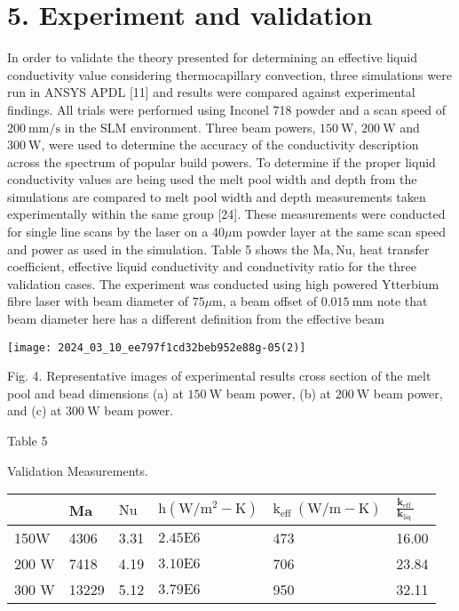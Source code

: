 \documentclass[10pt]{article}
\begin{document}
\section*{5. Experiment and validation}
In order to validate the theory presented for determining an effective liquid conductivity value considering thermocapillary convection, three simulations were run in ANSYS APDL [11] and results were compared against experimental findings. All trials were performed using Inconel 718 powder and a scan speed of $200 \mathrm{~mm} / \mathrm{s}$ in the SLM environment. Three beam powers, $150 \mathrm{~W}$, $200 \mathrm{~W}$ and $300 \mathrm{~W}$, were used to determine the accuracy of the conductivity description across the spectrum of popular build powers. To determine if the proper liquid conductivity values are being used the melt pool width and depth from the simulations are compared to melt pool width and depth measurements taken experimentally within the same group [24]. These measurements were conducted for single line scans by the laser on a $40 \mu \mathrm{m}$ powder layer at the same scan speed and power as used in the simulation. Table 5 shows the $\mathrm{Ma}, \mathrm{Nu}$, heat transfer coefficient, effective liquid conductivity and conductivity ratio for the three validation cases. The experiment was conducted using high powered Ytterbium fibre laser with beam diameter of $75 \mu \mathrm{m}$, a beam offset of $0.015 \mathrm{~mm}$ note that beam diameter here has a different definition from the effective beam

\begin{center}
\texttt{[image: 2024\_03\_10\_ee797f1cd32beb952e88g-05(2)]}
\end{center}

Fig. 4. Representative images of experimental results cross section of the melt pool and bead dimensions (a) at $150 \mathrm{~W}$ beam power, (b) at $200 \mathrm{~W}$ beam power, and (c) at $300 \mathrm{~W}$ beam power.

Table 5

Validation Measurements.

\begin{center}
\begin{tabular}{llllll}
\hline
 & Ma & $\mathrm{Nu}$ & $\mathrm{h}\left(\mathrm{W} / \mathrm{m}^{2}-\mathrm{K}\right)$ & $\mathrm{k}_{\text {eff }}(\mathrm{W} / \mathrm{m}-\mathrm{K})$ & $\frac{\boldsymbol{k}_{\text {eff }}}{\boldsymbol{k}_{\text {liq }}}$ \\
\hline
150W & 4306 & 3.31 & $2.45 \mathrm{E} 6$ & 473 & 16.00 \\
200 W & 7418 & 4.19 & $3.10 \mathrm{E} 6$ & 706 & 23.84 \\
300 W & 13229 & 5.12 & $3.79 \mathrm{E} 6$ & 950 & 32.11 \\
\hline
\end{tabular}
\end{center}
\end{document}
